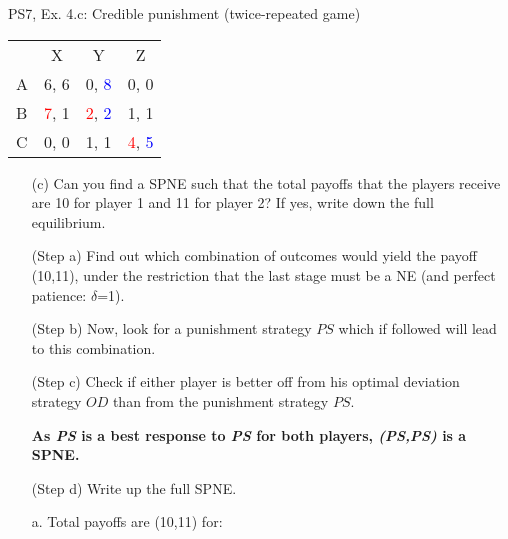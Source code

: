 \begin{frame}{PS7, Ex. 4.c: Credible punishment (twice-repeated game)}
    \vspace{-2pt}
    \begin{table}
      \begin{tabular}{l|c|c|c|}
        \multicolumn{1}{c}{} & \multicolumn{1}{c}{X} & \multicolumn{1}{c}{Y} & \multicolumn{1}{c}{Z}\\\cline{2-4}
        A   & 6, 6 &  0, \textcolor{blue}{8} &  0, 0  \\\cline{2-4}
        B & \textcolor{red}{7}, 1  & \textcolor{red}{2}, \textcolor{blue}{2} &  1, 1  \\\cline{2-4}
        C & 0, 0  & 1, 1 &  \textcolor{red}{4}, \textcolor{blue}{5}  \\\cline{2-4}
      \end{tabular}
    \end{table}
    \vspace{-4pt}
    \begin{itemize}
        \item[(c)] Can you find a SPNE such that the total payoffs that the players receive are 10 for player 1 and 11 for player 2? If yes, write down the full equilibrium.
    \end{itemize}
    \vspace{-8pt}
    \begin{multicols}{2}
      \begin{itemize}
        \item[(Step a)] Find out which combination of outcomes would yield the payoff (10,11), under the restriction that the last stage must be a NE (and perfect patience: $\delta$=1).
        \item[(Step b)] Now, look for a punishment strategy $PS$ which if followed will lead to this combination.
        \item[(Step c)] Check if either player is better off from his optimal deviation strategy $OD$ than from the punishment strategy $PS$.
        \item[]         \textbf{As \textit{PS} is a best response to \textit{PS} for both players, \textit{(PS,PS)} is a SPNE.}
        \item[(Step d)] Write up the full SPNE.
      \end{itemize}
      \vfill\null\columnbreak
      \begin{enumerate}
        \item[a.] Total payoffs are (10,11) for:
        \begin{itemize}\normalsize

\end{itemize}
\end{enumerate}
\end{multicols}
\end{frame}
